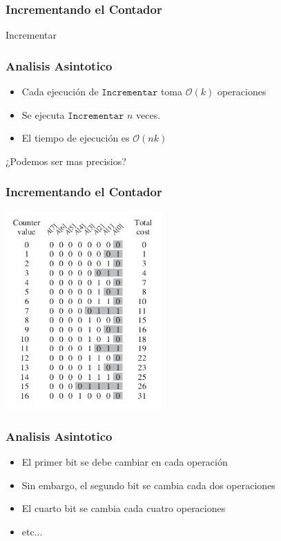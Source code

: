 \documentclass{beamer}
\begin{document}
\begin{frame}
\frametitle{Incrementando el Contador}

\begin{algorithm}[H]
    \caption{Incrementar}
    \begin{algorithmic}[1]
    \EndWhile
    \EndIf
    \EndProcedure
    \end{algorithmic}
\end{algorithm}

\end{frame}

\begin{frame}
\frametitle{Analisis Asintotico}
\begin{itemize}
    \item{Cada ejecuci\'on de $\mathtt{Incrementar}$ toma $\mathcal{O}(k)$
    operaciones}
    \item{Se ejecuta $\mathtt{Incrementar}$ $n$ veces.}
    \item{El tiempo de ejecuci\'on es $\mathcal{O}(nk)$}
\end{itemize}
¿Podemos ser mas precisios?
\end{frame}

\begin{frame}
\frametitle{Incrementando el Contador}

\begin{center}
\includegraphics[width=6cm]{inc.png}
\end{center}
    
\end{frame}

\begin{frame}
\frametitle{Analisis Asintotico}
\begin{itemize}
    \item{El primer bit se debe cambiar en cada operaci\'on}
    \item{Sin embargo, el segundo bit se cambia cada dos operaciones}
    \item{El cuarto bit se cambia cada cuatro operaciones}
    \item{etc...}
\end{itemize}
\end{frame}
\end{document}
